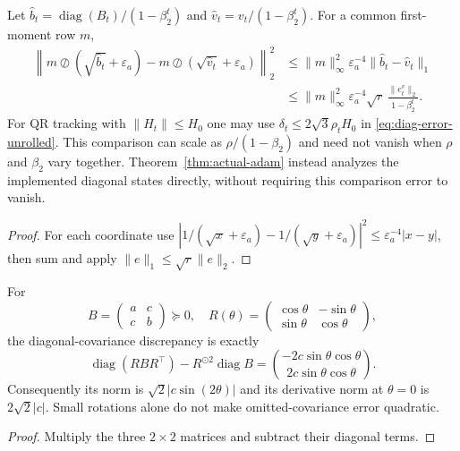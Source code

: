 \begin{corollary}
Let $\widehat b_t=\operatorname{diag}(B_t)/(1-\beta_2^t)$ and
$\widehat v_t=v_t/(1-\beta_2^t)$. For a common first-moment row $m$,
\begin{align}
 \left\|m\oslash(\sqrt{\widehat b_t}+\varepsilon_a)
       -m\oslash(\sqrt{\widehat v_t}+\varepsilon_a)\right\|_2^2
 &\le\|m\|_\infty^2\varepsilon_a^{-4}
                           \|\widehat b_t-\widehat v_t\|_1\\
 &\le\|m\|_\infty^2\varepsilon_a^{-4}\sqrt r\,
                       \frac{\|e_t^v\|_2}{1-\beta_2^t}.
 \label{eq:diag-direction-error}
\end{align}
For QR tracking with $\|H_t\|\le H_0$ one may use
$\delta_t\le2\sqrt3\rho_tH_0$ in
\eqref{eq:diag-error-unrolled}. This comparison can scale as
$\rho/(1-\beta_2)$ and need not vanish when $\rho$ and $\beta_2$ vary together.
Theorem~\ref{thm:actual-adam} instead analyzes the implemented diagonal
states directly, without requiring this comparison error to vanish.
\end{corollary}
\begin{proof}
For each coordinate use
$|1/(\sqrt x+\varepsilon_a)-1/(\sqrt y+\varepsilon_a)|^2
\le\varepsilon_a^{-4}|x-y|$, then sum and apply
$\|e\|_1\le\sqrt r\|e\|_2$.
\end{proof}

\begin{proposition}
For
\begin{equation}
 B=\begin{pmatrix}a&c\\c&b\end{pmatrix}\succeq0,\quad
 R(\theta)=\begin{pmatrix}\cos\theta&-\sin\theta\\
                            \sin\theta&\cos\theta\end{pmatrix},
\end{equation}
the diagonal-covariance discrepancy is exactly
\begin{equation}
 \operatorname{diag}(RBR^\top)-R^{\odot2}\operatorname{diag}B
     =\binom{-2c\sin\theta\cos\theta}{2c\sin\theta\cos\theta}.
\end{equation}
Consequently its norm is $\sqrt2|c\sin(2\theta)|$
and its derivative norm at $\theta=0$ is $2\sqrt2|c|$.
Small rotations alone do not make omitted-covariance error quadratic.
\end{proposition}
\begin{proof}
Multiply the three $2\times2$ matrices and subtract their diagonal terms.
\end{proof}

